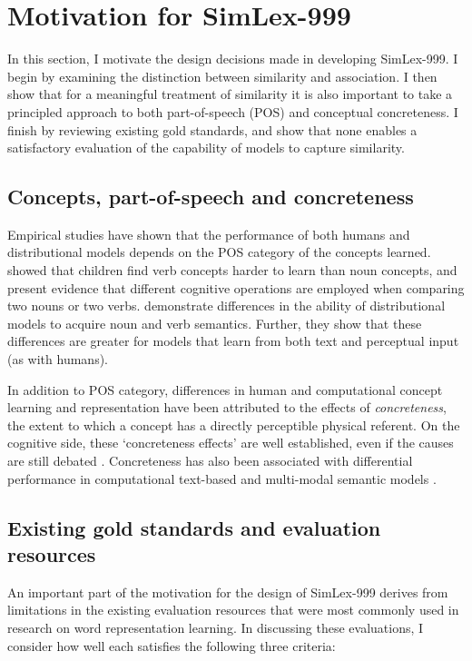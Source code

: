 \section{Motivation for SimLex-999}
\label{motivation}

In this section, I motivate the design decisions made in developing SimLex-999. I begin by examining the distinction between similarity and association. I then show that for a meaningful treatment of similarity it is also important to take a principled approach to both part-of-speech (POS) and conceptual concreteness. I finish by reviewing existing gold standards, and show that none enables a satisfactory evaluation of the capability of models to capture similarity.

\subsection{Concepts, part-of-speech and concreteness}

Empirical studies have shown that the performance of both humans and distributional models depends on the POS category of the concepts learned. \cite{gentner2006verbs} showed that children find verb concepts harder to learn than noun concepts, and \cite{markman1997similar} present evidence that different cognitive operations are employed when comparing two nouns or two verbs. \cite{hill2014multi} demonstrate differences in the ability of distributional models to acquire noun and verb semantics. Further, they show that these differences are greater for models that learn from both text and perceptual input (as with humans).

In addition to POS category, differences in human and computational concept learning and representation have been attributed to the effects of \emph{concreteness}, the extent to which a concept has a directly perceptible physical referent. On the cognitive side, these `concreteness effects' are well established, even if the causes are still debated \citep{paivio1991dual,hill2013quantitative}. Concreteness has also been associated with differential performance in computational text-based \citep{hill2013concreteness} and multi-modal semantic models \citep{kielaimproving}.

\subsection{Existing gold standards and evaluation resources}
\label{existing}

An important part of the motivation for the design of SimLex-999 derives from limitations in the existing evaluation resources that were most commonly used in research on word representation learning. In discussing these evaluations, I consider how well each satisfies the following three criteria:  


